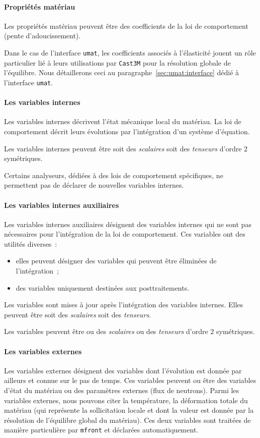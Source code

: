 \documentclass[rectoverso,pleiades,pstricks,leqno,anti]{texmf/note_technique_2010}
\newcommand{\mfront}{\texttt{mfront}}
\newcommand{\castem}{\texttt{Cast3M}}
\newcommand{\umat}{\texttt{umat}}
\begin{document}
\paragraph{Propriétés matériau} Les propriétés matériau peuvent être des
coefficients de la loi de comportement (pente d'adoucissement).

Dans le cas de l'interface \umat{}, les coefficients associés à
l'élasticité jouent un rôle particulier lié à leurs utilisations par
\castem{} pour la résolution globale de l'équilibre. Nous détaillerons
ceci au paragraphe~\ref{sec:umat:interface} dédié à l'interface \umat{}.

\paragraph{Les variables internes} Les variables internes décrivent
l'état mécanique local du matériau. La loi de comportement décrit leurs
évolutions par l'intégration d'un système d'équation.

Les variables internes peuvent être soit des {\em scalaires} soit des
{\em tenseurs} d'ordre \(2\) symétriques.

Certains analyseurs, dédiées à des lois de comportement spécifiques,
ne permettent pas de déclarer de nouvelles variables internes.

\paragraph{Les variables internes auxiliaires} Les variables internes
auxiliaires désignent des variables internes qui ne sont pas nécessaires
pour l'intégration de la loi de comportement. Ces variables ont des
utilités diverses~:
\begin{itemize}
  \item elles peuvent désigner des variables qui peuvent être éliminées
  de l'intégration~;
  \item des variables uniquement destinées aux posttraitements.
\end{itemize}

Les variables sont mises à jour après l'intégration des variables
internes. Elles peuvent être soit des {\em scalaires} soit des {\em
  tenseurs}.

Les variables peuvent être ou des {\em scalaires} ou des {\em
  tenseurs} d'ordre \(2\) symétriques.

\paragraph{Les variables externes} Les variables externes désignent
des variables dont l'évolution est donnée par ailleurs et connue sur
le pas de temps. Ces variables peuvent ou être des variables d'état du
matériau ou des paramètres externes (flux de neutrons). Parmi les
variables externes, nous pouvons citer la température, la déformation
totale du matériau (qui représente la sollicitation locale et dont la
valeur est donnée par la résolution de l'équilibre global du
matériau). Ces deux variables sont traitées de manière particulière
par \mfront{} et déclarées automatiquement.
\end{document}
